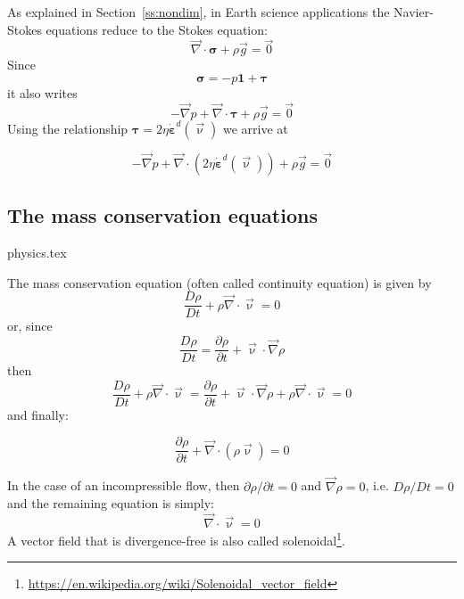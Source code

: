 As explained in Section~\ref{ss:nondim}, in Earth science applications the Navier-Stokes 
equations reduce to the Stokes equation:
\begin{equation}
{\vec \nabla}\cdot {\bm \sigma} + \rho {\vec g} = \vec{0}
\end{equation}
Since 
\begin{equation}
{\bm \sigma} = -p {\bm 1} + {\bm \tau}
\end{equation}
it also writes
\begin{equation}
-{\vec \nabla}p + {\vec \nabla}\cdot {\bm \tau} + \rho {\vec g} = \vec{0}
\end{equation}
Using the relationship ${\bm \tau} = 2 \eta \dot{\bm \varepsilon}^d(\vec\upnu)$ we arrive at 
\begin{mdframed}[backgroundcolor=blue!5]
\begin{equation}
-{\vec \nabla}p + {\vec \nabla}\cdot (2 \eta \dot{\bm \varepsilon}^d(\vec\upnu) ) + \rho {\vec g} = \vec{0}
\end{equation}
\end{mdframed}

\subsection{The mass conservation equations} 
\begin{flushright} {\tiny {\color{gray} physics.tex}} \end{flushright}

The mass conservation equation (often called continuity equation) is given by
\[
\frac{D\rho}{Dt} + \rho {\vec \nabla}\cdot{\vec \upnu} = 0
\]
or, since 
\[
\frac{D\rho}{Dt} = \frac{\partial \rho}{\partial t} + {\vec \upnu}\cdot {\vec \nabla}\rho
\]
then 
\[
\frac{D\rho}{Dt} + \rho {\vec \nabla}\cdot{\vec \upnu} = 
\frac{\partial \rho}{\partial t} + {\vec \upnu}\cdot {\vec \nabla}\rho
 + \rho {\vec \nabla}\cdot{\vec \upnu} = 0 
\]
and finally:
\begin{mdframed}[backgroundcolor=blue!5]
\begin{equation}
\frac{\partial \rho}{\partial t} + {\vec \nabla}\cdot(\rho {\vec \upnu}) = 0
\label{eq:massconvgen}
\end{equation}
\end{mdframed}
In the case of an incompressible flow, then $\partial \rho/\partial t=0$ and 
${\vec \nabla}\rho=0$, i.e. $D\rho/Dt=0$ and the remaining equation is simply:
\[
{\vec \nabla}\cdot{\vec \upnu} = 0
\]
A vector field that is divergence-free is also called 
solenoidal\footnote{\url{https://en.wikipedia.org/wiki/Solenoidal_vector_field}}.


